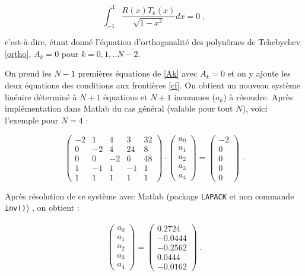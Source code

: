 \documentclass{report}
\begin{document}
\begin{equation}
\int_{-1}^1 \frac{R(x) T_k(x)}{\sqrt{1-x^2}} dx = 0\;,
\end{equation}

c'est-à-dire, étant donné l'équation d'orthogonalité des polynômes de Tchebychev \eqref{ortho}, $A_{k}=0$ pour $k=0,1,..N-2$.

On prend les $N-1$ premières équations de \eqref{Ak} avec $A_{k}=0$  et on y ajoute les deux équations des conditions aux frontières \eqref{cf}. On obtient un nouveau système linéaire déterminé à $N+1$ équations et $N+1$ inconnues ($a_{k}$) à résoudre. Après implémentation dans Matlab du cas général (valable pour tout $N$), voici l'exemple pour $N=4$ :

\begin{equation}
\begin{pmatrix}
-2 & 1 & 4 & 3 & 32\\ 
0 & -2 & 4 & 24 & 8\\ 
0 & 0 & -2 & 6 & 48\\ 
1 & -1 & 1 & -1 & 1\\ 
1 & 1 & 1 & 1 & 1
\end{pmatrix} \cdot \begin{pmatrix}
 a_0\\ 
 a_1\\ 
 a_2\\ 
 a_3\\ 
 a_4
\end{pmatrix} = 
\begin{pmatrix}
 -2\\ 
 0\\ 
 0\\ 
 0\\ 
 0
\end{pmatrix}\;.
\end{equation}

Après résolution de ce système avec Matlab (package \texttt{LAPACK} et non commande \texttt{inv()}) , on obtient :

\begin{eqnarray}
\begin{pmatrix}
 a_0\\ 
 a_1\\ 
 a_2\\ 
 a_3\\ 
 a_4 
 \end{pmatrix}
 = \left(
\begin{array}{r}
  0.2724\\ 
 -0.0444\\ 
 -0.2562\\ 
 0.0444\\ 
 -0.0162 
 \end{array}\right)\;.
\end{eqnarray}  
\end{document}
